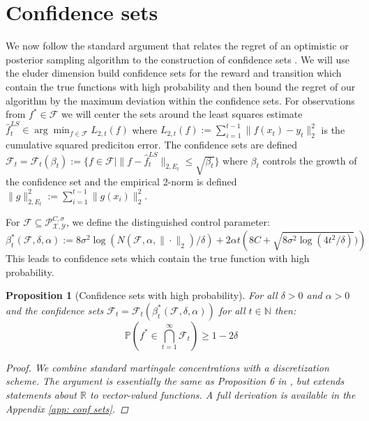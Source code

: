 \documentclass{article}
\newtheorem{prop}{Proposition}
\newcommand{\Prob}{\mathds{P}}
\newcommand{\Real}{\mathds{R}}
\newcommand{\Nat}{\mathbb{N}}
\newcommand{\Xc}{\mathcal{X}}
\newcommand{\Yc}{\mathcal{Y}}
\newcommand{\Pc}{\mathcal{P}}
\newcommand{\Fc}{\mathcal{F}}
\begin{document}
\section{Confidence sets}
\label{sec: conf}
We now follow the standard argument that relates the regret of an optimistic or posterior sampling algorithm to the construction of confidence sets \cite{jaksch2010near,osband2013more}.
We will use the eluder dimension build confidence sets for the reward and transition which contain the true functions with high probability and then bound the regret of our algorithm by the maximum deviation within the confidence sets.
For observations from $f^* \in \Fc$ we will center the sets around the least squares estimate $\hat{f}_t^{LS} \in \arg \min_{f \in \Fc} L_{2,t}(f)$ where $L_{2,t}(f) := \sum_{i=1}^{t-1} \|f(x_t) - y_t \|^2_2$ is the cumulative squared prediciton error.
The confidence sets are defined $\Fc_t = \Fc_t(\beta_t) := \{ f \in \Fc | \| f-\hat{f}_t^{LS} \|_{2,E_t} \le \sqrt{\beta_t} \}$ where $\beta_t$ controls the growth of the confidence set and the empirical 2-norm is defined $\|g\|_{2,E_t}^2 := \sum_{i=1}^{t-1} \|g(x_i)\|_2^2$.

For $\Fc \subseteq \Pc^{C,\sigma}_{\Xc,\Yc}$, we define the distinguished control parameter:
\begin{equation}
\label{eq: beta star}
	\beta^*_t(\Fc,\delta,\alpha) := 8 \sigma^2 \log(N(\Fc,\alpha,\|\cdot\|_2)/\delta) +
	2 \alpha t \left(8C + \sqrt{8\sigma^2 \log(4t^2/\delta)}) \right)
\end{equation}
This leads to confidence sets which contain the true function with high probability.

\begin{prop}[Confidence sets with high probability]
\label{prop: conf sets} \hspace{0.00000000000001mm} \newline
For all $\delta>0$ and $\alpha >0$ and the confidence sets $\Fc_t = \Fc_t(\beta^*_t(\Fc,\delta,\alpha))$ for all $t \in \Nat$ then:
$$\Prob \left( f^* \in \bigcap_{t=1}^\infty \Fc_t \right) \ge 1-2\delta $$
\begin{proof}
We combine standard martingale concentrations with a discretization scheme.
The argument is essentially the same as Proposition 6 in \cite{russo2013}, but extends statements about $\Real$ to vector-valued functions.
A full derivation is available in the Appendix \ref{app: conf sets}.
\end{proof}
\end{prop}
\end{document}
